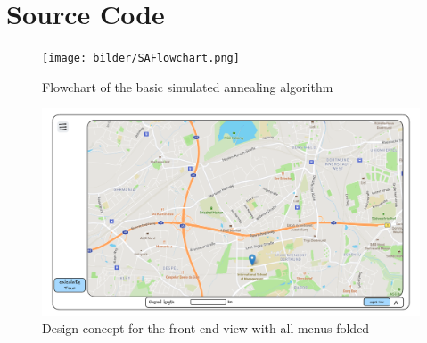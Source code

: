 \chapter{Source Code}



\begin{figure}
\texttt{[image: bilder/SAFlowchart.png]}
\caption{Flowchart of the basic simulated annealing algorithm}
\label{fig:SAFlowchart}
\end{figure}




\begin{figure}[H]
	\includegraphics[width=0.9\linewidth]{bilder/Concept burger menu and stats hidden.png}
	\caption{Design concept for the front end view with all menus folded}
	\label{fig:frontendConceptMenusClosed}
\end{figure}


